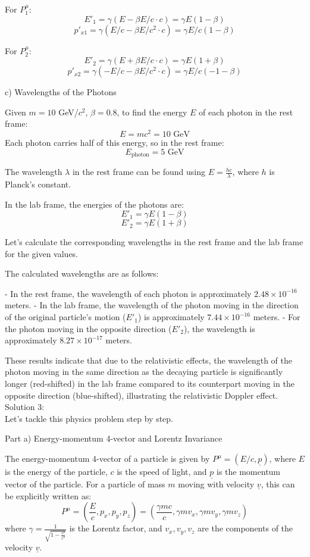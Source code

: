 \documentclass[a4paper,11pt]{article}
\begin{document}
For \(P_1^\mu\):
\[ E'_1 = \gamma (E - \beta E/c \cdot c) = \gamma E (1 - \beta) \]
\[ p'_{x1} = \gamma (E/c - \beta E/c^2 \cdot c) = \gamma E/c (1 - \beta) \]

For \(P_2^\mu\):
\[ E'_2 = \gamma (E + \beta E/c \cdot c) = \gamma E (1 + \beta) \]
\[ p'_{x2} = \gamma ( -E/c - \beta E/c^2 \cdot c) = \gamma E/c (-1 - \beta) \]

c) Wavelengths of the Photons

Given \(m = 10\) GeV/\(c^2\), \(\beta = 0.8\), to find the energy \(E\) of each photon in the rest frame:
\[ E = mc^2 = 10 \text{ GeV} \]
Each photon carries half of this energy, so in the rest frame:
\[ E_{\text{photon}} = 5 \text{ GeV} \]

The wavelength \(\lambda\) in the rest frame can be found using \(E = \frac{hc}{\lambda}\), where \(h\) is Planck's constant.

In the lab frame, the energies of the photons are:
\[ E'_{1} = \gamma E (1 - \beta) \]
\[ E'_{2} = \gamma E (1 + \beta) \]

Let's calculate the corresponding wavelengths in the rest frame and the lab frame for the given values.

The calculated wavelengths are as follows:

- In the rest frame, the wavelength of each photon is approximately \(2.48 \times 10^{-16}\) meters.
- In the lab frame, the wavelength of the photon moving in the direction of the original particle's motion (\(E'_1\)) is approximately \(7.44 \times 10^{-16}\) meters.
- For the photon moving in the opposite direction (\(E'_2\)), the wavelength is approximately \(8.27 \times 10^{-17}\) meters.

These results indicate that due to the relativistic effects, the wavelength of the photon moving in the same direction as the decaying particle is significantly longer (red-shifted) in the lab frame compared to its counterpart moving in the opposite direction (blue-shifted), illustrating the relativistic Doppler effect. \\

\noindent Solution 3: \\

Let's tackle this physics problem step by step.

Part a) Energy-momentum 4-vector and Lorentz Invariance

The energy-momentum 4-vector of a particle is given by \( P^\mu = (E/c, \underline{p}) \), where \( E \) is the energy of the particle, \( c \) is the speed of light, and \( \underline{p} \) is the momentum vector of the particle. For a particle of mass \( m \) moving with velocity \( \underline{v} \), this can be explicitly written as:
\[ P^\mu = \left(\frac{E}{c}, p_x, p_y, p_z\right) = \left(\frac{\gamma m c}{c}, \gamma m v_x, \gamma m v_y, \gamma m v_z\right) \]
where \( \gamma = \frac{1}{\sqrt{1 - \frac{v^2}{c^2}}} \) is the Lorentz factor, and \( v_x, v_y, v_z \) are the components of the velocity \( \underline{v} \).
\end{document}
